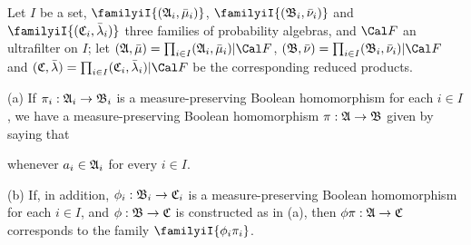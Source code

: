  Let $I$ be a set,
$\familyiI{(\frak A_i,\bar\mu_i)}$,
$\familyiI{(\frak B_i,\bar\nu_i)}$ and
$\familyiI{(\frak C_i,\bar\lambda_i)}$ three families of probability
algebras, and $\Cal F$ an ultrafilter on $I$;  let
$(\frak A,\bar\mu)=\prod_{i\in I}(\frak A_i,\bar\mu_i)|\Cal F$,
$(\frak B,\bar\nu)=\prod_{i\in I}(\frak B_i,\bar\nu_i)|\Cal F$ and
$(\frak C,\bar\lambda)=\prod_{i\in I}(\frak C_i,\bar\lambda_i)|\Cal F$
be the corresponding reduced products.

(a) If $\pi_i:\frak A_i\to\frak B_i$ is a measure-preserving Boolean
homomorphism for each $i\in I$, we have a measure-preserving Boolean
homomorphism $\pi:\frak A\to\frak B$ given by saying that


\noindent whenever $a_i\in\frak A_i$ for every $i\in I$.

(b) If, in addition, $\phi_i:\frak B_i\to\frak C_i$ is a measure-preserving
Boolean homomorphism for each $i\in I$, and $\phi:\frak B\to\frak C$ is
constructed as in (a), then $\phi\pi:\frak A\to\frak C$ corresponds to the
family $\familyiI{\phi_i\pi_i}$.


